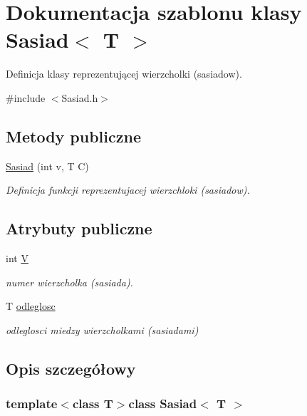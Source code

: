 \hypertarget{class_sasiad}{\section{\-Dokumentacja szablonu klasy \-Sasiad$<$ \-T $>$}
\label{class_sasiad}
}


\-Definicja klasy reprezentującej wierzcholki (sasiadow).  




{\ttfamily \#include $<$\-Sasiad.\-h$>$}

\subsection*{\-Metody publiczne}
\begin{DoxyCompactItemize}
\item 
\hyperlink{class_sasiad_ab3a4c20f1a13cf7a0a845e1a6fb030fc}{\-Sasiad} (int v, \-T \-C)
\begin{DoxyCompactList}\small\item\em \-Definicja funkcji reprezentujacej wierzchloki (sasiadow). \end{DoxyCompactList}\end{DoxyCompactItemize}
\subsection*{\-Atrybuty publiczne}
\begin{DoxyCompactItemize}
\item 
int \hyperlink{class_sasiad_a4d1513ab8314f44310f9213901f870a1}{\-V}
\begin{DoxyCompactList}\small\item\em numer wierzcholka (sasiada). \end{DoxyCompactList}\item 
\-T \hyperlink{class_sasiad_a5d55d683a251153836e60fac63276830}{odleglosc}
\begin{DoxyCompactList}\small\item\em odleglosci miedzy wierzcholkami (sasiadami) \end{DoxyCompactList}\end{DoxyCompactItemize}


\subsection{\-Opis szczegółowy}
\subsubsection*{template$<$class T$>$class Sasiad$<$ T $>$}



